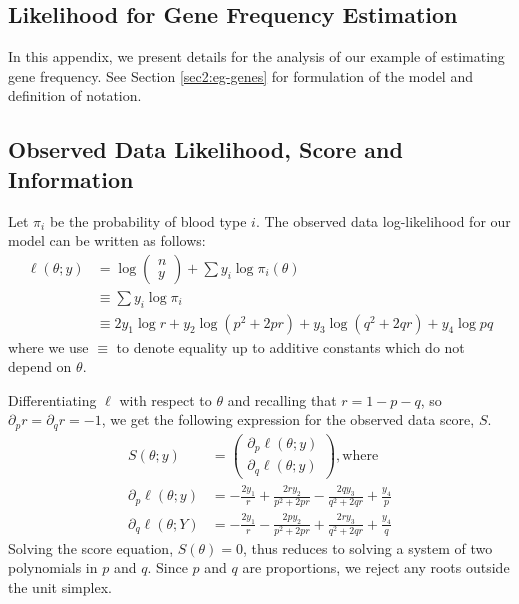 \documentclass[11pt, oneside]{article}   	%
\begin{document}
\begin{appendices}

    \section{Likelihood for Gene Frequency Estimation}
    \label{app:blood}

    In this appendix, we present details for the analysis of our example of estimating gene frequency. See Section \ref{sec2:eg-genes} for formulation of the model and definition of notation.

    \subsection{Observed Data Likelihood, Score and Information}
    \label{app:blood_obs}

    Let $\pi_i$ be the probability of blood type $i$. The observed data log-likelihood for our model can be written as follows:
    \begin{align}
        \ell(\theta; y) &= \log \begin{pmatrix} n \\ y \end{pmatrix} + \sum y_i \log \pi_i(\theta)\\
        & \equiv \sum y_i \log \pi_i\\
        &\equiv 2 y_1 \log r + y_2 \log(p^2 + 2pr) + y_3 \log(q^2 + 2qr) + y_4 \log pq
    \end{align}
    where we use $\equiv$ to denote equality up to additive constants which do not depend on $\theta$.

    Differentiating $\ell$ with respect to $\theta$ and recalling that $r = 1 - p - q$, so $\partial_p r = \partial_q r = -1$, we get the following expression for the observed data score, $S$.
    \begin{align}
        S(\theta; y) &= \begin{pmatrix}
            \partial_p \ell(\theta; y)\\
            \partial_q \ell(\theta; y) 
        \end{pmatrix} \mathrm{, where}\\
        \partial_p \ell(\theta; y) &= - \frac{2 y_1}{r}  + \frac{2r y_2}{p^2 + 2pr}  - \frac{2q y_3}{q^2 + 2qr}  + \frac{y_4}{p} \label{eq:gene_obs_score1}\\
        \partial_q \ell(\theta; Y) &= - \frac{2 y_1}{r}  - \frac{2p y_2}{p^2 + 2pr}  + \frac{2r y_3}{q^2 + 2qr}  + \frac{y_4}{q} \label{eq:gene_obs_score2}
    \end{align}
    Solving the score equation, $S(\theta) = 0$, thus reduces to solving a system of two polynomials in $p$ and $q$. Since $p$ and $q$ are proportions, we reject any roots outside the unit simplex.


\end{appendices}
\end{document}

